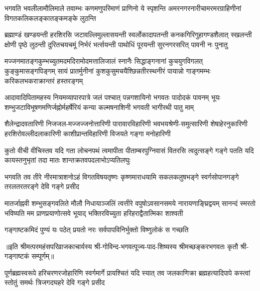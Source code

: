 

\fourlineindentedshloka
{भगवति भवलीलामौलिमाले तवाम्भः}
{कणमणुपरिमाणं प्राणिनो ये स्पृशन्ति}
{अमरनगरनारीचामरमरग्राहिणीनां}
{विगतकलिकलङ्कातङ्कमङ्के लुठन्ति}%

\fourlineindentedshloka
{ब्रह्माण्डं खण्डयन्ती हरशिरसि जटावल्लिमुल्लासयन्ती}
{स्वर्लोकादापतन्ती कनकगिरिगुहागण्डशैलात् स्खलन्ती}
{क्षोणी पृष्ठे लुठन्ती दुरितचयचमूं निर्भरं भर्त्सयन्ती}
{पाथोधिं पूरयन्ती सुरनगरसरित् पावनी नः पुनातु}%

\fourlineindentedshloka
{मज्जनमातङ्गकुम्भच्युतमदमदिरामोदमत्तालिजालं}
{स्नानैः सिद्धाङ्गनानां कुचयुगविगलत् कुङ्कुमासङ्गपिङ्गम्}
{सायं प्रातर्मुनीनां कुशकुसुमचयैश्छिन्नतीरस्थनीरं}
{पायान्नो गाङ्गमम्भः करिकलभकराक्रान्तरं हस्तरङ्गम्}%

\fourlineindentedshloka
{आदावादिपितामहस्य नियमव्यापारपात्रे जलं}
{पश्चात् पन्नगशायिनो भगवतः पादोदकं पावनम्}
{भूयः शम्भुजटाविभूषणमणिर्जह्नोर्महर्षेरियं}
{कन्या कल्मषनाशिनी भगवती भागीरथी पातु माम्}%

\fourlineindentedshloka
{शैलेन्द्रादवतारिणी निजजल-मज्जज्जनोत्तारिणी}
{पारावारविहारिणी भवभयश्रेणी-समुत्सारिणी}
{शेषाहेरनुकारिणी हरशिरोवल्लीदलाकारिणी}
{काशीप्रान्तविहारिणी विजयते गङ्गा मनोहारिणी}%

\fourlineindentedshloka
{कुतो वीची वीचिस्तव यदि गता लोचनपथं}
{त्वमापीता पीताम्बरपुग्निवासं वितरसि}
{त्वदुत्सङ्गे गङ्गे पतति यदि कायस्तनुभृतां}
{तदा मातः शान्तक्रतवपदलाभोऽप्यतिलघुः}%

\fourlineindentedshloka
{भगवति तव तीरे नीरमात्राशनोऽहं}
{विगतविषयतृष्णः कृष्णमाराधयामि}
{सकलकलुषभङ्गे स्वर्गसोपानगङ्गे}
{तरलतरतरङ्गे देवि गङ्गे प्रसीद}%

\fourlineindentedshloka
{मातर्जाह्नवी शम्भुसङ्गवलिते मौलौ निधायाञ्जलिं}
{त्वत्तीरे वपुषोऽवसानसमये नारायणाङ्घ्रिद्वयम्}
{सानन्दं स्मरतो भविष्यति मम प्राणप्रयाणोत्सवे}
{भूयाद् भक्तिरविच्युता हरिहराद्वैतात्मिका शाश्वती}%

\twolineshloka
{गङ्गाष्टकमिदं पुण्यं यः पठेत् प्रयतो नरः}
{सर्वपापविनिर्भुक्तो विष्णुलोकं स गच्छति}%


॥इति श्रीमत्परमहंसपरिव्राजकाचार्यस्य श्री-गोविन्द-भगवत्पूज्य-पाद-शिष्यस्य
श्रीमच्छङ्करभगवतः कृतौ श्री-गङ्गाष्टकं सम्पूर्णम्॥

{पूर्णब्रह्मस्वरूपे हरिचरणरजोहारिणि स्वर्गमार्गे}
{प्रायश्चितं यदि स्यात् तव जलकाणिक्रा ब्रह्महत्यादिपापे}
{कस्त्वां स्तोतुं समर्थः त्रिजगदघहरे देवि गङ्गे प्रसीद}%